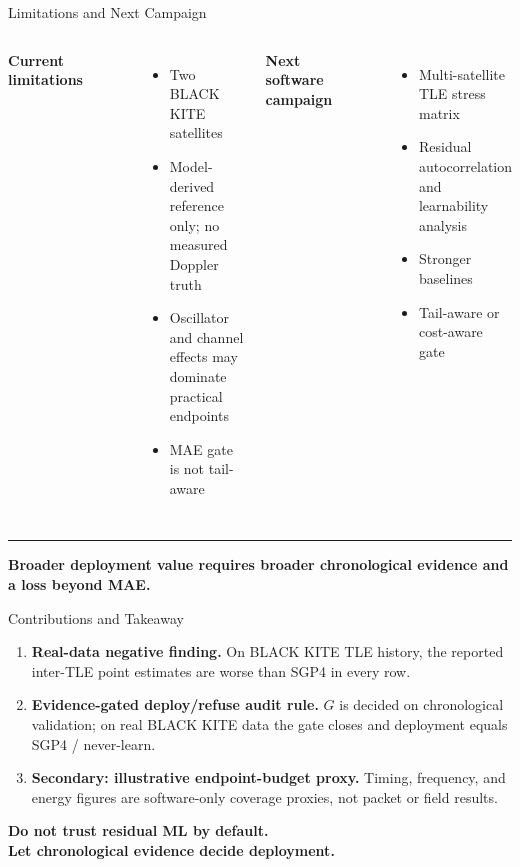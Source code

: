 \documentclass[aspectratio=169,10pt]{beamer}
\newcommand{\takeaway}[1]{%
  \vfill
  {\color{LineGray}\rule{\textwidth}{0.5pt}}\par
  \vspace{0.04cm}
  {\footnotesize\bfseries #1}
}
\begin{document}
\begin{frame}{Limitations and Next Campaign}
\begin{columns}[T,onlytextwidth]
    {\bfseries Current limitations}\\[-1pt]
    {\color{LineGray}\rule{\linewidth}{0.5pt}}\\[5pt]
    {\normalsize
    \begin{itemize}
      \item Two BLACK KITE satellites
      \item Model-derived reference only; no measured Doppler truth
      \item Oscillator and channel effects may dominate practical endpoints
      \item MAE gate is not tail-aware
    \end{itemize}}

    {\bfseries Next software campaign}\\[-1pt]
    {\color{LineGray}\rule{\linewidth}{0.5pt}}\\[5pt]
    {\normalsize
    \begin{itemize}
      \item Multi-satellite TLE stress matrix
      \item Residual autocorrelation and learnability analysis
      \item Stronger baselines
      \item Tail-aware or cost-aware gate
    \end{itemize}}
  \end{columns}
  \takeaway{Broader deployment value requires broader chronological evidence and a loss beyond MAE.}
\end{frame}

\begin{frame}{Contributions and Takeaway}
  \vspace{0.05cm}
  \begin{enumerate}
    \setlength{\itemsep}{0.34cm}
    \item \textbf{Real-data negative finding.} On BLACK KITE TLE history, the reported inter-TLE point estimates are worse than SGP4 in every row.
    \item \textbf{Evidence-gated deploy/refuse audit rule.} $G$ is decided on chronological validation; on real BLACK KITE data the gate closes and deployment equals SGP4 / never-learn.
    \item \textbf{Secondary: illustrative endpoint-budget proxy.} Timing, frequency, and energy figures are software-only coverage proxies, not packet or field results.
  \end{enumerate}
  \vspace{0.35cm}
  \begin{center}
    {\Large\bfseries Do not trust residual ML by default.}\\[4pt]
    {\Large\bfseries Let chronological evidence decide deployment.}
  \end{center}
\end{frame}
\end{document}
